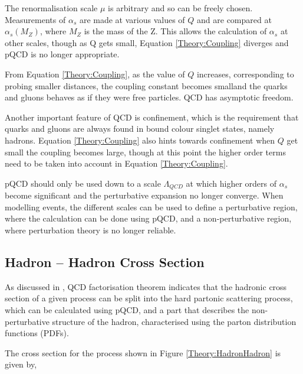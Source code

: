 The renormalisation scale $\mu$ is arbitrary and so can be freely chosen.
Measurements of $\alpha_s$ are made at various values of $Q$ and are compared at $\alpha_s(M_Z)$, where $M_Z$ is the mass of the Z.
This allows the calculation of $\alpha_s$ at other scales, though as Q gets small, Equation \ref{Theory:Coupling} diverges and pQCD is no longer appropriate.

From Equation \ref{Theory:Coupling}, as the value of $Q$ increases, corresponding to probing smaller distances, the coupling constant becomes smalland the quarks and gluons behaves as if they were free particles.
QCD has asymptotic freedom.

Another important feature of QCD is confinement, which is the requirement that quarks and gluons are always found in bound colour singlet states, namely hadrons.
Equation \ref{Theory:Coupling} also hints towards confinement when $Q$ get small the coupling becomes large, though at this point the higher order terms need to be taken into account in Equation \ref{Theory:Coupling}. 


pQCD should only be used down to a scale $\Lambda_{QCD}$ at which higher orders of $\alpha_s$ become significant and the perturbative expansion no longer converge.
When modelling events, the different scales can be used to define a perturbative region, where the calculation can be done using pQCD, and a non-perturbative region, where perturbation theory is no longer reliable.




\subsection{Hadron -- Hadron Cross Section}


As discussed in \cite{ref:HardInt}, QCD factorisation theorem indicates that the hadronic cross section of a given process can be split into the hard partonic scattering process, which can be calculated using pQCD, and a part that describes the non-perturbative structure of the hadron, characterised using the parton distribution functions (PDFs).


The cross section for the process shown in Figure \ref{Theory:HadronHadron} is given by,

